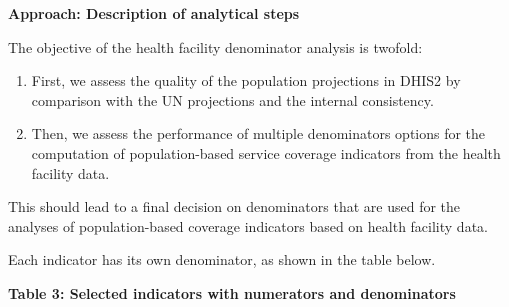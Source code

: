 \documentclass[
  english,
  letterpaper,
  DIV=11,
  numbers=noendperiod]{scrreprt}
\providecommand{\tightlist}{%
  \setlength{\itemsep}{0pt}\setlength{\parskip}{0pt}}
\begin{document}
\textbf{Approach: Description of analytical steps}

The objective of the health facility denominator analysis is twofold:

\begin{enumerate}
\def\labelenumi{\arabic{enumi}.}
\tightlist
\item
  First, we assess the quality of the population projections in DHIS2 by
  comparison with the UN projections and the internal consistency.
\item
  Then, we assess the performance of multiple denominators options for
  the computation of population-based service coverage indicators from
  the health facility data.
\end{enumerate}

This should lead to a final decision on denominators that are used for
the analyses of population-based coverage indicators based on health
facility data.

Each indicator has its own denominator, as shown in the table below.

\textbf{Table 3: Selected indicators with numerators and denominators}
\end{document}
